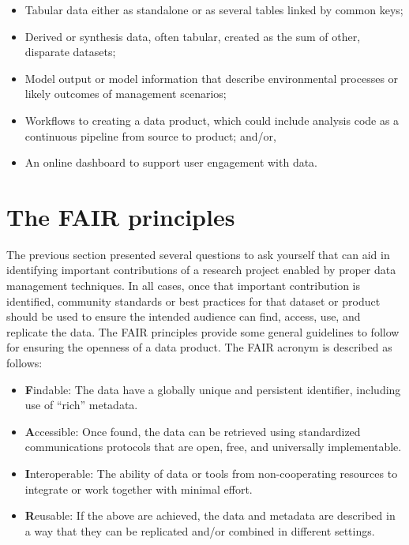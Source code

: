 \documentclass[
]{book}
\providecommand{\tightlist}{%
  \setlength{\itemsep}{0pt}\setlength{\parskip}{0pt}}
\begin{document}
\begin{itemize}
\tightlist
\item
  Tabular data either as standalone or as several tables linked by common keys;
\item
  Derived or synthesis data, often tabular, created as the sum of other, disparate datasets;
\item
  Model output or model information that describe environmental processes or likely outcomes of management scenarios;
\item
  Workflows to creating a data product, which could include analysis code as a continuous pipeline from source to product; and/or,
\item
  An online dashboard to support user engagement with data.
\end{itemize}

\hypertarget{fair}{%
\section{The FAIR principles}\label{fair}}

The previous section presented several questions to ask yourself that can aid in identifying important contributions of a research project enabled by proper data management techniques. In all cases, once that important contribution is identified, community standards or best practices for that dataset or product should be used to ensure the intended audience can find, access, use, and replicate the data. The FAIR principles \citep{Wilkinson16} provide some general guidelines to follow for ensuring the openness of a data product. The FAIR acronym is described as follows:

\begin{itemize}
\tightlist
\item
  \textbf{F}indable: The data have a globally unique and persistent identifier, including use of ``rich'' metadata.
\item
  \textbf{A}ccessible: Once found, the data can be retrieved using standardized communications protocols that are open, free, and universally implementable.
\item
  \textbf{I}nteroperable: The ability of data or tools from non-cooperating resources to integrate or work together with minimal effort.
\item
  \textbf{R}eusable: If the above are achieved, the data and metadata are described in a way that they can be replicated and/or combined in different settings.
\end{itemize}
\end{document}
